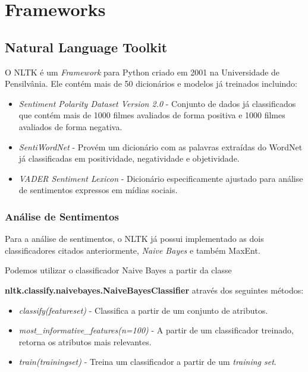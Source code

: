 \chapter{Frameworks}
\label{cap:Frameworks}

\section{Natural Language Toolkit}

O \ac{NLTK} é um \textit{Framework} para Python
criado em 2001 na Universidade de Pensilvânia. Ele contém mais de 50 dicionários
e modelos já treinados incluindo:

\begin{itemize}
  \item \textit{Sentiment Polarity Dataset Version 2.0} - Conjunto de dados já
  classificados que contém mais de 1000 filmes avaliados de forma positiva e
  1000 filmes avaliados de forma negativa.
  \item \textit{SentiWordNet} - Provém um dicionário com as palavras extraídas
  do WordNet já classificadas em positividade, negatividade e objetividade.
  \item \textit{VADER Sentiment Lexicon} - Dicionário especificamente ajustado
  para análise de sentimentos expressos em mídias sociais.
\end{itemize}


\subsection{Análise de Sentimentos}

Para a análise de sentimentos, o \ac{NLTK} já possui implementado as dois
classificadores citados anteriormente, \textit{Naive Bayes} e também
\ac{MaxEnt}.

Podemos utilizar o classificador Naive Bayes a partir da classe

\textbf{nltk.classify.naivebayes.NaiveBayesClassifier} através dos seguintes métodos:

\begin{itemize}
  \item \textit{classify(featureset)} - Classifica a partir de um conjunto de
  atributos.
  \item \textit{most\_informative\_features(n=100)} - A partir de um
  classificador treinado, retorna os atributos mais relevantes.
  \item \textit{train(trainingset)} - Treina um classificador a partir de um \textit{training set}.
\end{itemize}

